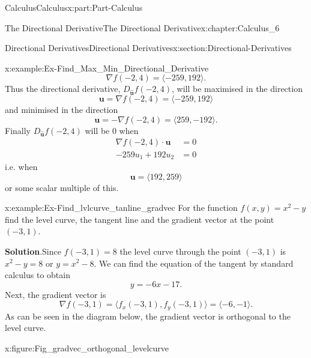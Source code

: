 \documentclass[oneside,10pt,]{book}
\newcommand{\blocktitlefont}{\relax}
\numberwithin{equation}{section}
\newcommand{\bm}[1]{\boldsymbol{#1}}
\newcommand{\amp}{&}
\begin{document}
\begin{partptx}{Calculus}{}{Calculus}{}{}{x:part:Part-Calculus}
\begin{chapterptx}{The Directional Derivative}{}{The Directional Derivative}{}{}{x:chapter:Calculus_6}
\begin{sectionptx}{Directional Derivatives}{}{Directional Derivatives}{}{}{x:section:Directional-Derivatives}
\begin{example}{}{x:example:Ex-Find_Max_Min_Directional_Derivative}
\begin{equation*}
\nabla f(-2,4) = \langle -259,192 \rangle\text{.}
\end{equation*}
Thus the directional derivative, \(D_{\hat{\bm{u}}} f(-2,4)\), will be maximised in the direction%
\begin{equation*}
\bm{u} = \nabla f(-2,4) = \langle -259, 192 \rangle
\end{equation*}
and minimised in the direction%
\begin{equation*}
\bm{u} = -\nabla f(-2,4) = \langle 259, -192 \rangle\text{.}
\end{equation*}
Finally \(D_{\hat{\bm{u}}} f(-2,4)\) will be \(0\) when%
\begin{align*}
\nabla f(-2,4) \cdot \bm{u} \amp = 0\\
-259u_1 + 192u_2 \amp = 0
\end{align*}
i.e. when%
\begin{equation*}
\bm{u} = \langle 192, 259 \rangle
\end{equation*}
or some scalar multiple of this.%
\end{example}
\begin{example}{}{x:example:Ex-Find_lvlcurve_tanline_gradvec}%
For the function \(f(x,y) = x^2-y\) find the level curve, the tangent line and the gradient vector at the point \((-3,1)\).%
\par\smallskip%
\noindent\textbf{\blocktitlefont Solution}.\hypertarget{g:solution:id550232}{}\quad{}Since \(f(-3,1)=8\) the level curve through the point \((-3,1)\) is \(x^2-y=8\) or \(y=x^2-8\). We can find the equation of the tangent by standard calculus to obtain%
\begin{equation*}
y=-6x-17\text{.}
\end{equation*}
Next, the gradient vector is%
\begin{equation*}
\nabla f(-3,1) = \langle f_x(-3,1), f_y(-3,1) \rangle = \langle -6, -1 \rangle\text{.}
\end{equation*}
As can be seen in the diagram below, the gradient vector is orthogonal to the level curve.%
\begin{figureptx}{}{x:figure:Fig_gradvec_orthogonal_levelcurve}{}%
\begin{image}{0.15}{0.7}{0.15}%

\end{image}
\end{figureptx}
\end{example}
\end{sectionptx}
\end{chapterptx}
\end{partptx}
\end{document}
